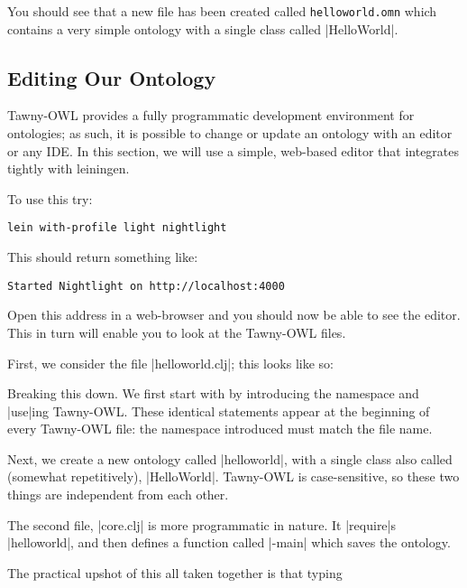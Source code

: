 You should see that a new file has been created called
\verb|helloworld.omn| which contains a very simple ontology with a
single class called |HelloWorld|.

\subsection{Editing Our Ontology}
\label{sec:editing-our-ontology}

Tawny-OWL provides a fully programmatic development environment for
ontologies; as such, it is possible to change or update an ontology
with an editor or any IDE. In this section, we will use a simple,
web-based editor that integrates tightly with leiningen.

To use this try:

\begin{verbatim}
lein with-profile light nightlight
\end{verbatim}

This should return something like:

\begin{verbatim}
Started Nightlight on http://localhost:4000
\end{verbatim}

Open this address in a web-browser and you should now be able to see
the editor. This in turn will enable you to look at the Tawny-OWL files.

First, we consider the file |helloworld.clj|; this looks like so:



Breaking this down. We first start with by introducing the namespace
and |use|ing Tawny-OWL. These identical statements appear at the
beginning of every Tawny-OWL file: the namespace introduced must match
the file name.

Next, we create a new ontology called |helloworld|, with a single
class also called (somewhat repetitively), |HelloWorld|. Tawny-OWL is
case-sensitive, so these two things are independent from each other.

The second file, |core.clj| is more programmatic in nature. It
|require|s |helloworld|, and then defines a function called |-main|
which saves the ontology.



The practical upshot of this all taken together is that typing

